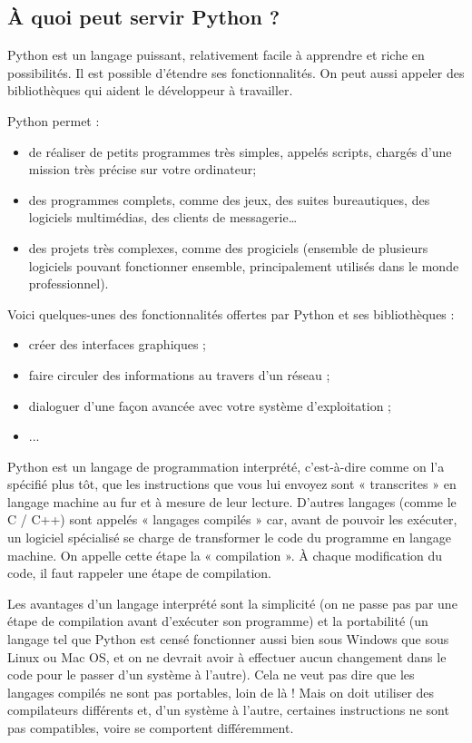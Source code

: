 \subsection{À quoi peut servir Python ?}




Python est un langage puissant, relativement facile à apprendre et riche en possibilités. Il est possible d'étendre ses fonctionnalités. On peut aussi appeler des bibliothèques qui aident le développeur à travailler. 

Python permet :
\begin{itemize}
\item de réaliser de petits programmes très simples, appelés scripts, chargés d'une mission très précise sur votre ordinateur;
\item des programmes complets, comme des jeux, des suites bureautiques, des logiciels multimédias, des clients de messagerie…
\item des projets très complexes, comme des progiciels (ensemble de plusieurs logiciels pouvant fonctionner ensemble, principalement utilisés dans le monde professionnel).
\end{itemize}

Voici quelques-unes des fonctionnalités offertes par Python et ses bibliothèques :
\begin{itemize}
\item créer des interfaces graphiques ;
\item faire circuler des informations au travers d'un réseau ;
\item dialoguer d'une façon avancée avec votre système d'exploitation ;
\item ...
\end{itemize}


Python est un langage de programmation interprété, c'est-à-dire comme on l'a spécifié plus tôt, que les instructions que vous lui envoyez sont « transcrites » en langage machine au fur et à mesure de leur lecture. D'autres langages (comme le C / C++) sont appelés « langages compilés » car, avant de pouvoir les exécuter, un logiciel spécialisé se charge de transformer le code du programme en langage machine. On appelle cette étape la « compilation ». À chaque modification du code, il faut rappeler une étape de compilation.

Les avantages d'un langage interprété sont la simplicité (on ne passe pas par une étape de compilation avant d'exécuter son programme) et la portabilité (un langage tel que Python est censé fonctionner aussi bien sous Windows que sous Linux ou Mac OS, et on ne devrait avoir à effectuer aucun changement dans le code pour le passer d'un système à l'autre). Cela ne veut pas dire que les langages compilés ne sont pas portables, loin de là ! Mais on doit utiliser des compilateurs différents et, d'un système à l'autre, certaines instructions ne sont pas compatibles, voire se comportent différemment.

